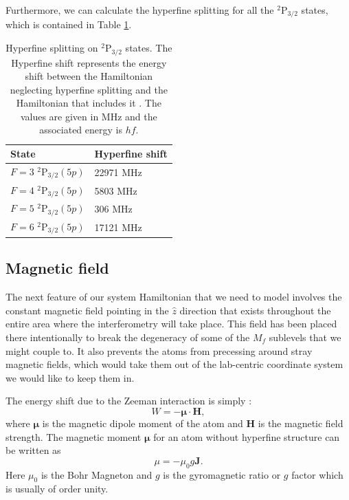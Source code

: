 Furthermore, we can calculate the hyperfine splitting for all the $^2$P$_{3/2}$ states, which is contained in Table \ref{tableOfHyperfinedeetuings}.

\begin{table}[h]
\centering
\begin{tabular}{|l|l|}
\hline
State & Hyperfine shift  \\ \hline \hline
$F=3$ $^2$P$_{3/2} (5p)$ & 22971  MHz\\ \hline
$F=4$ $^2$P$_{3/2} (5p)$ &  5803 MHz\\ \hline
$F=5$ $^2$P$_{3/2} (5p)$ &  306 MHz\\ \hline
$F=6$ $^2$P$_{3/2} (5p)$ &   17121 MHz\\ \hline
\end{tabular}
\caption{Hyperfine splitting on $^2$P$_{3/2}$ states. The Hyperfine shift represents the energy shift between the Hamiltonian neglecting hyperfine splitting and the Hamiltonian that includes it
. The values are given in MHz and the associated energy is $hf$. }
\label{tableOfHyperfinedeetuings}
\end{table}

\subsection{Magnetic field}\label{zeeman}

The next feature of our system Hamiltonian that we need to model involves the constant magnetic field pointing in the $\hat{z}$ direction that exists throughout the entire area where the interferometry will take place. This field has been placed there intentionally to break the degeneracy of some of the $M_f$ sublevels that we might couple to. It also prevents the atoms from precessing around stray magnetic fields, which would take them out of the lab-centric coordinate system we would like to keep them in.

The energy shift due to the Zeeman interaction is simply \cite{sobelman_spectra}: 
\begin{equation}
W=-\mathbf{\mu}\cdot\mathbf{H},
\end{equation}
where $\mathbf{\mu}$ is the magnetic dipole moment of the atom and $\mathbf{H}$ is the magnetic field strength. The magnetic moment $\mathbf{\mu}$ for an atom without hyperfine structure can be written as \cite{sobelman_spectra}
\begin{equation}
\mu=-\mu_0 g \mathbf{J}.
\end{equation}
Here $\mu_0$ is the Bohr Magneton and $g$ is the gyromagnetic ratio or $g$ factor which is usually of order unity. 


